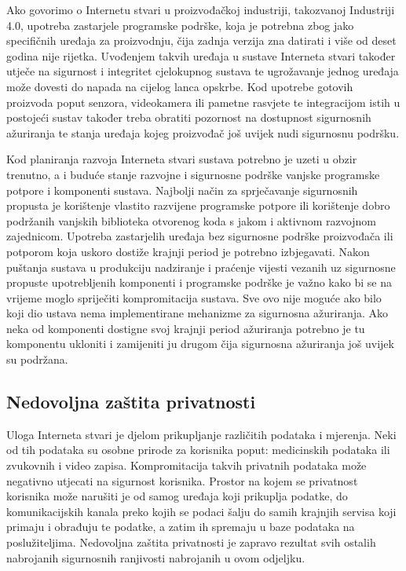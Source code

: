 \documentclass[times, utf8, diplomski]{fer}
\begin{document}
Ako govorimo o Internetu stvari u proizvođačkoj industriji, takozvanoj Industriji 4.0, upotreba zastarjele programske podrške, koja je potrebna zbog jako specifičnih uređaja za proizvodnju, čija zadnja verzija zna datirati i više od deset godina nije rijetka. Uvođenjem takvih uređaja u sustave Interneta stvari također utječe na sigurnost i integritet cjelokupnog sustava te ugrožavanje jednog uređaja može dovesti do napada na cijelog lanca opskrbe. Kod upotrebe gotovih proizvoda poput senzora, videokamera ili pametne rasvjete te integracijom istih u postojeći sustav također treba obratiti pozornost na dostupnost sigurnosnih ažuriranja te stanja uređaja kojeg proizvođač još uvijek nudi sigurnosnu podršku.

Kod planiranja razvoja Interneta stvari sustava potrebno je uzeti u obzir trenutno, a i buduće stanje razvojne i sigurnosne podrške vanjske programske potpore i komponenti sustava. Najbolji način za sprječavanje sigurnosnih propusta je korištenje vlastito razvijene programske potpore ili korištenje dobro podržanih vanjskih biblioteka otvorenog koda s jakom i aktivnom razvojnom zajednicom. Upotreba zastarjelih uređaja bez sigurnosne podrške proizvođača ili potporom koja uskoro dostiže krajnji period  je potrebno izbjegavati. Nakon puštanja sustava u produkciju nadziranje i praćenje vijesti vezanih uz sigurnosne propuste upotrebljenih komponenti i programske podrške je važno kako bi se na vrijeme moglo spriječiti kompromitacija sustava. Sve ovo nije moguće ako bilo koji dio ustava nema implementirane mehanizme za sigurnosna ažuriranja. Ako neka od komponenti dostigne svoj krajnji period ažuriranja potrebno je tu komponentu ukloniti i zamijeniti ju drugom čija sigurnosna ažuriranja još uvijek su podržana.  

\subsection{Nedovoljna zaštita privatnosti}
Uloga Interneta stvari je djelom prikupljanje različitih podataka i mjerenja. Neki od tih podataka su osobne prirode za korisnika poput: medicinskih podataka ili zvukovnih i video zapisa. Kompromitacija takvih privatnih podataka može negativno utjecati na sigurnost korisnika. Prostor na kojem se privatnost korisnika može narušiti je od samog uređaja koji prikuplja podatke, do komunikacijskih kanala preko kojih se podaci šalju do samih krajnjih servisa koji primaju i obrađuju te podatke, a zatim ih spremaju u baze podataka na poslužiteljima. Nedovoljna zaštita privatnosti je zapravo rezultat svih ostalih nabrojanih sigurnosnih ranjivosti nabrojanih u ovom odjeljku. 
\end{document}
